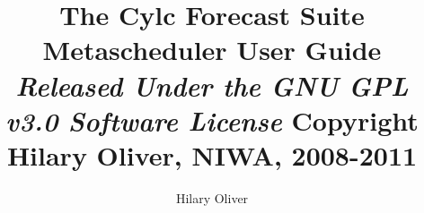 \documentclass[11pt,a4paper,titlepage]{article}
\title{The Cylc Forecast Suite Metascheduler\linebreak 
User Guide \linebreak 
{\em \small
} \linebreak
{\em \small Released Under the GNU GPL v3.0 Software License} \linebreak
{\small Copyright Hilary Oliver, NIWA, 2008-2011}}
\author{Hilary Oliver}
\begin{document}
\maketitle

\pagebreak



\pagebreak
\tableofcontents
\listoffigures

\pagebreak

\end{document}
